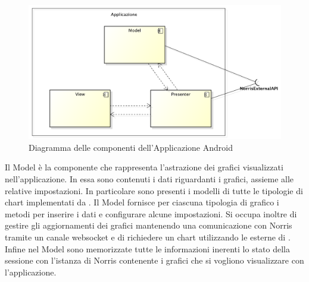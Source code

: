 	\begin{figure}[H]\centering
        \includegraphics[width=\textwidth]{SpecificaTecnica/Pics/ComponentiApplicazione}
        \caption{Diagramma delle componenti dell'Applicazione Android}
    \end{figure}
            Il Model è la componente che rappresenta l'astrazione dei grafici visualizzati nell'applicazione. In essa sono contenuti i dati riguardanti i grafici, assieme alle relative impostazioni. In particolare sono presenti i modelli di tutte le tipologie di chart implementati da . Il Model fornisce per ciascuna tipologia di grafico i metodi per inserire i dati e configurare alcune impostazioni. Si occupa inoltre di gestire gli aggiornamenti dei grafici mantenendo una comunicazione con Norris tramite un canale websocket e di richiedere un chart utilizzando le  esterne di . Infine nel Model sono memorizzate tutte le informazioni inerenti lo stato della sessione con l'istanza di Norris contenente i grafici che si vogliono visualizzare con l'applicazione.
    
